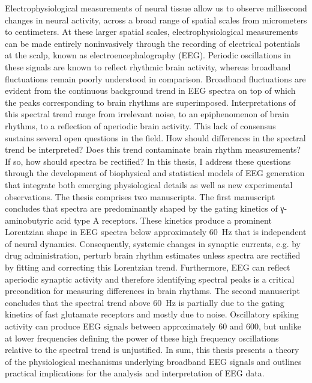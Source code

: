 \documentclass[11pt]{report}
\begin{document}
Electrophysiological measurements of neural tissue allow us to observe millisecond changes in neural activity, across a broad range of spatial scales from micrometers to centimeters. At these larger spatial scales, electrophysiological measurements can be made entirely noninvasively through the recording of electrical potentials at the scalp, known as electroencephalography (EEG). Periodic oscillations in these signals are known to reflect rhythmic brain activity, whereas broadband fluctuations remain poorly understood in comparison. Broadband fluctuations are evident from the continuous background trend in EEG spectra on top of which the peaks corresponding to brain rhythms are superimposed. Interpretations of this spectral trend range from irrelevant noise, to an epiphenomenon of brain rhythms, to a reflection of aperiodic brain activity. This lack of consensus sustains several open questions in the field. How should differences in the spectral trend be interpreted? Does this trend contaminate brain rhythm measurements? If so, how should spectra be rectified? In this thesis, I address these questions through the development of biophysical and statistical models of EEG generation that integrate both emerging physiological details as well as new experimental observations. The thesis comprises two manuscripts. The first manuscript concludes that spectra are predominantly shaped by the gating kinetics of γ-aminobutyric acid type A receptors. These kinetics produce a prominent Lorentzian shape in EEG spectra below approximately \qty{60}{\hertz} that is independent of neural dynamics. Consequently, systemic changes in synaptic currents, e.g. by drug administration, perturb brain rhythm estimates unless spectra are rectified by fitting and correcting this Lorentzian trend. Furthermore, EEG can reflect aperiodic synaptic activity and therefore identifying spectral peaks is a critical precondition for measuring differences in brain rhythms. The second manuscript concludes that the spectral trend above \qty{60}{\hertz} is partially due to the gating kinetics of fast glutamate receptors and mostly due to noise. Oscillatory spiking activity can produce EEG signals between approximately 60 and 600, but unlike at lower frequencies defining the power of these high frequency oscillations relative to the spectral trend is unjustified. In sum, this thesis presents a theory of the physiological mechanisms underlying broadband EEG signals and outlines practical implications for the analysis and interpretation of EEG data.

\newpage
\end{document}
